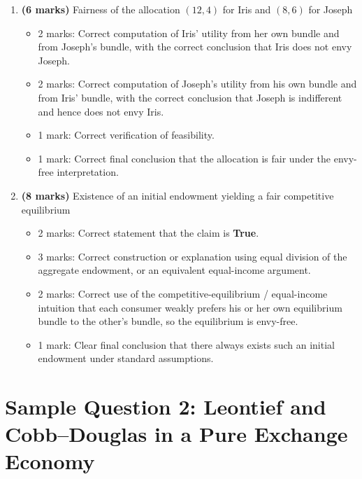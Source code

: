 \documentclass[12pt]{article}
\begin{document}
\begin{enumerate}[label=(\alph*)]
    \item \textbf{(6 marks)} Fairness of the allocation \((12,4)\) for Iris and \((8,6)\) for Joseph
    \begin{itemize}
        \item 2 marks: Correct computation of Iris' utility from her own bundle and from Joseph's bundle, with the correct conclusion that Iris does not envy Joseph.
        \item 2 marks: Correct computation of Joseph's utility from his own bundle and from Iris' bundle, with the correct conclusion that Joseph is indifferent and hence does not envy Iris.
        \item 1 mark: Correct verification of feasibility.
        \item 1 mark: Correct final conclusion that the allocation is fair under the envy-free interpretation.
    \end{itemize}

    \item \textbf{(8 marks)} Existence of an initial endowment yielding a fair competitive equilibrium
    \begin{itemize}
        \item 2 marks: Correct statement that the claim is \textbf{True}.
        \item 3 marks: Correct construction or explanation using equal division of the aggregate endowment, or an equivalent equal-income argument.
        \item 2 marks: Correct use of the competitive-equilibrium / equal-income intuition that each consumer weakly prefers his or her own equilibrium bundle to the other's bundle, so the equilibrium is envy-free.
        \item 1 mark: Clear final conclusion that there always exists such an initial endowment under standard assumptions.
    \end{itemize}
\end{enumerate}
\newpage
\section{Sample Question 2: Leontief and Cobb--Douglas in a Pure Exchange Economy}
\end{document}
